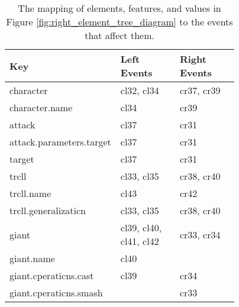 \begin{table}[ht]
\centering
\caption{The mapping of elements, features, and values in Figure \ref{fig:right_element_tree_diagram} to the events that affect them.}
\label{tab:keyeventsmap}
\begin{scriptsize}
\begin{sffamily}
\begin{tabular}{|m{0.25\linewidth}|m{0.26\linewidth}|m{0.26\linewidth}|}
\hline
\textbf{Key} & \textbf{Left Events} & \textbf{Right Events} \\ \hline
character                          & cl32, cl34                                & cr37, cr39                                 \\ \hline
character.name                     & cl34                                      & cr39                                       \\ \hline
attack                             & cl37                                      & cr31                                       \\ \hline
attack.parameters.target           & cl37                                      & cr31                                       \\ \hline
target                             & cl37                                      & cr31                                       \\ \hline
trcll                              & cl33, cl35                                & cr38, cr40                                 \\ \hline
trcll.name                         & cl43                                      & cr42                                       \\ \hline
trcll.generalizaticn               & cl33, cl35                                & cr38, cr40                                 \\ \hline
giant                              & cl39, cl40, cl41, cl42                    & cr33, cr34                                 \\ \hline
giant.name                         & cl40                                      &                                            \\ \hline
giant.cperaticns.cast              & cl39                                      & cr34                                       \\ \hline
giant.cperaticns.smash             &                                           & cr33                                       \\ \hline

\end{tabular}
\end{sffamily}
\end{scriptsize}
\end{table}
